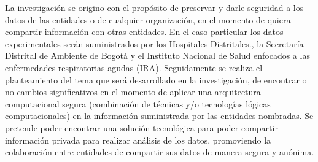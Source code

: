 \documentclass[a4paper,openright,12pt]{book}
\theoremstyle{definition}
\theoremstyle{remark}
\begin{document}
La investigación se origino con el propósito de preservar y darle seguridad a los datos de las entidades o de cualquier organización, en el momento de quiera compartir información con otras entidades. En el caso particular los datos experimentales serán suministrados por los Hospitales Distritales., la Secretaría Distrital de Ambiente de Bogotá y el Instituto Nacional de Salud enfocados a las enfermedades respiratorias agudas (IRA). Seguidamente se realiza el planteamiento del tema que será desarrollado en la investigación, de encontrar o no cambios significativos en el momento de aplicar una arquitectura computacional segura (combinación de técnicas y/o tecnologías lógicas computacionales) en la información suministrada por las entidades nombradas. Se pretende poder encontrar una solución tecnológica para poder compartir información privada para realizar análisis de los datos, promoviendo la colaboración entre entidades de compartir sus datos de manera segura y anónima.\\\\
\end{document}
